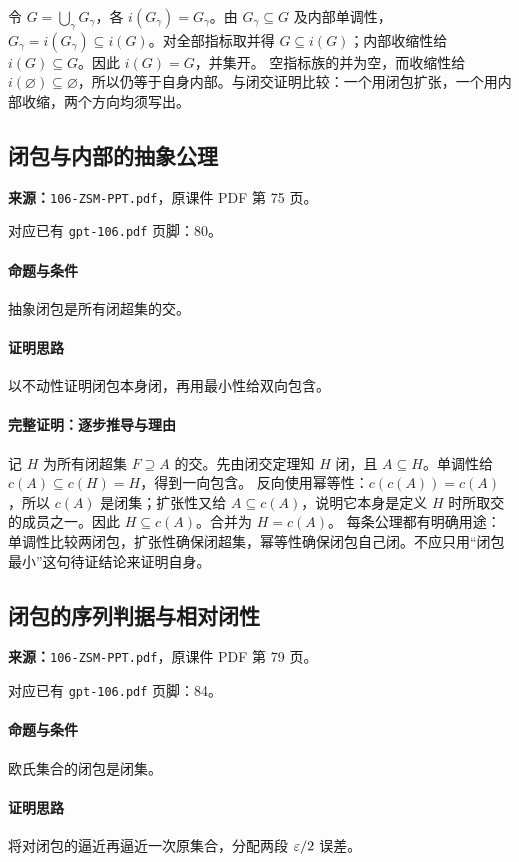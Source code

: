 令 $G=\bigcup_\gamma G_\gamma$，各 $i(G_\gamma)=G_\gamma$。由 $G_\gamma\subseteq G$ 及内部单调性，$G_\gamma=i(G_\gamma)\subseteq i(G)$。对全部指标取并得 $G\subseteq i(G)$；内部收缩性给 $i(G)\subseteq G$。因此 $i(G)=G$，并集开。
空指标族的并为空，而收缩性给 $i(\varnothing)\subseteq\varnothing$，所以仍等于自身内部。与闭交证明比较：一个用闭包扩张，一个用内部收缩，两个方向均须写出。

\clearpage\subsection{闭包与内部的抽象公理}
\textbf{来源：}\texttt{106-ZSM-PPT.pdf}，原课件 PDF 第 75 页。\par
对应已有 \texttt{gpt-106.pdf} 页脚：80。\par
\paragraph{命题与条件}抽象闭包是所有闭超集的交。
\paragraph{证明思路}以不动性证明闭包本身闭，再用最小性给双向包含。
\paragraph{完整证明：逐步推导与理由}

记 $H$ 为所有闭超集 $F\supseteq A$ 的交。先由闭交定理知 $H$ 闭，且 $A\subseteq H$。单调性给 $c(A)\subseteq c(H)=H$，得到一向包含。
反向使用幂等性：$c(c(A))=c(A)$，所以 $c(A)$ 是闭集；扩张性又给 $A\subseteq c(A)$，说明它本身是定义 $H$ 时所取交的成员之一。因此 $H\subseteq c(A)$。合并为 $H=c(A)$。
每条公理都有明确用途：单调性比较两闭包，扩张性确保闭超集，幂等性确保闭包自己闭。不应只用“闭包最小”这句待证结论来证明自身。

\clearpage\subsection{闭包的序列判据与相对闭性}
\textbf{来源：}\texttt{106-ZSM-PPT.pdf}，原课件 PDF 第 79 页。\par
对应已有 \texttt{gpt-106.pdf} 页脚：84。\par
\paragraph{命题与条件}欧氏集合的闭包是闭集。
\paragraph{证明思路}将对闭包的逼近再逼近一次原集合，分配两段 $\varepsilon/2$ 误差。
